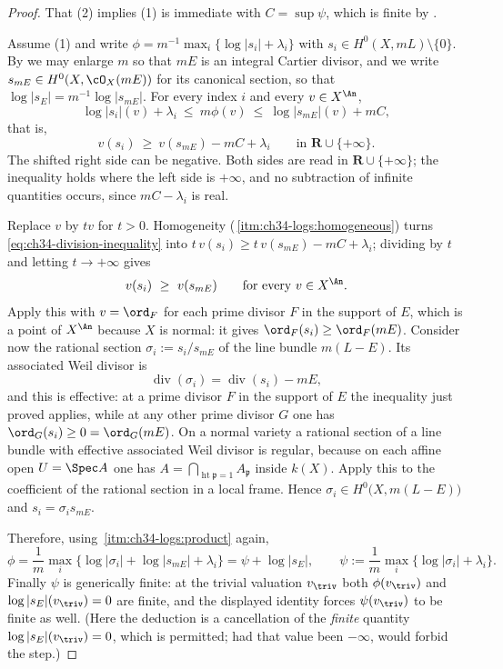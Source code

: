 \begin{proof}
That (2) implies (1) is immediate with $C=\sup\psi$, which is finite by
.

Assume (1) and write $\phi=m^{-1}\max_i\{\log|s_i|+\lambda_i\}$ with
$s_i\in H^0(X,mL)\setminus\{0\}$.  By  we may
enlarge $m$ so that $mE$ is an integral Cartier divisor, and we write
$s_{mE}\in H^0(X,\cO_X(mE))$ for its canonical section, so that
$\log|s_E|=m^{-1}\log|s_{mE}|$.  For every index $i$ and every
$v\in X^{\An}$,
\[
 \log|s_i|(v)+\lambda_i\ \le\ m\phi(v)\ \le\ \log|s_{mE}|(v)+mC,
\]
that is,
\begin{equation}
\label{eq:ch34-division-inequality}
 v(s_i)\ \ge\ v(s_{mE})-mC+\lambda_i
 \qquad\text{in }\mathbf R\cup\{+\infty\}.
\end{equation}
The shifted right side can be negative.  Both sides are read in
$\mathbf R\cup\{+\infty\}$; the inequality holds where the left side is
$+\infty$, and no subtraction of infinite quantities occurs, since
$mC-\lambda_i$ is real.

Replace $v$ by $tv$ for $t>0$.  Homogeneity
(\,\cref{itm:ch34-logs:homogeneous}) turns
\eqref{eq:ch34-division-inequality} into
$t\,v(s_i)\ge t\,v(s_{mE})-mC+\lambda_i$; dividing by $t$ and letting
$t\to+\infty$ gives
\[
 v(s_i)\ \ge\ v(s_{mE})\qquad\text{for every }v\in X^{\An}.
\]
Apply this with $v=\ord_F$ for each prime divisor $F$ in the support of
$E$, which is a point of $X^{\An}$ because $X$ is normal: it gives
$\ord_F(s_i)\ge\ord_F(mE)$.  Consider now the rational section
$\sigma_i:=s_i/s_{mE}$ of the line bundle $m(L-E)$.  Its associated
Weil divisor is
\[
 \operatorname{div}(\sigma_i)
 =\operatorname{div}(s_i)-mE ,
\]
and this is effective: at a prime divisor $F$ in the support of $E$ the
inequality just proved applies, while at any other prime divisor $G$ one
has $\ord_G(s_i)\ge0=\ord_G(mE)$.  On a normal variety a rational section
of a line bundle with effective associated Weil divisor is regular, because
on each affine open $U=\Spec A$ one has
$A=\bigcap_{\operatorname{ht}\mathfrak p=1}A_{\mathfrak p}$ inside $k(X)$.
Apply this to the coefficient of the rational section in a local frame.  Hence
$\sigma_i\in H^0\bigl(X,m(L-E)\bigr)$ and $s_i=\sigma_is_{mE}$.

Therefore, using
\,\cref{itm:ch34-logs:product} again,
\[
 \phi=\frac1m\max_i\{\log|\sigma_i|+\log|s_{mE}|+\lambda_i\}
 =\psi+\log|s_E|,
 \qquad
 \psi:=\frac1m\max_i\{\log|\sigma_i|+\lambda_i\}.
\]
Finally $\psi$ is generically finite: at the trivial valuation
$v_{\triv}$ both $\phi(v_{\triv})$ and $\log|s_E|(v_{\triv})=0$ are
finite, and the displayed identity forces $\psi(v_{\triv})$ to be finite
as well.  (Here the deduction is a cancellation of the \emph{finite}
quantity $\log|s_E|(v_{\triv})=0$, which is permitted; had that value been
$-\infty$,  would forbid the step.)
\end{proof}

